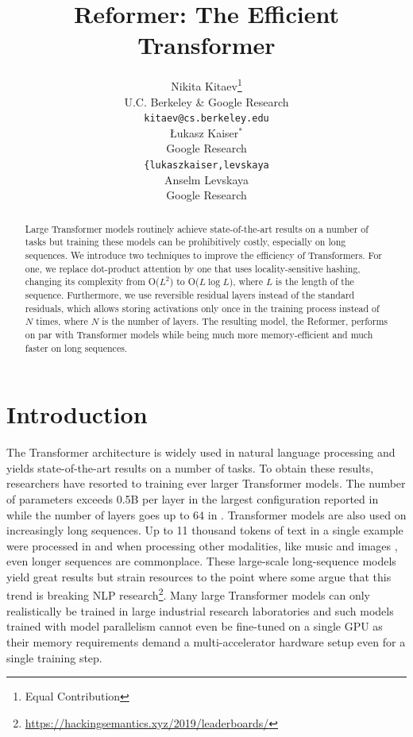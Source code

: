 \documentclass{article} %
\title{Reformer: The Efficient Transformer}
\author{Nikita Kitaev\thanks{Equal Contribution}  \\
U.C. Berkeley \& Google Research\\
\texttt{kitaev@cs.berkeley.edu} \\
\And 
\L{}ukasz Kaiser$^*$ \\
Google Research\\
\texttt{\{lukaszkaiser,levskaya\rlap{\}@google.com}} \\
\And 
Anselm Levskaya \\
Google Research\\
}
\begin{document}
\maketitle

\begin{abstract}
Large Transformer models routinely achieve state-of-the-art results on
a number of tasks but training these models can be prohibitively costly,
especially on long sequences. We introduce two techniques to improve
the efficiency of Transformers. For one, we replace dot-product attention
by one that uses locality-sensitive hashing, changing its complexity
from O($L^2$) to O($L\log L$), where $L$ is the length of the sequence.
Furthermore, we use reversible residual layers instead of the standard
residuals, which allows storing activations only once in the training
process instead of $N$ times, where $N$ is the number of layers.
The resulting model, the Reformer, performs on par with Transformer models
while being much more memory-efficient and much faster on long sequences.
\end{abstract}

\section{Introduction}

The Transformer architecture \citep{transformer} is widely used in natural language processing
and yields state-of-the-art results on a number of tasks. To obtain these results,
researchers have resorted to training ever larger Transformer models. The number of parameters exceeds
0.5B per layer in the largest configuration reported in \citep{meshtf} while the number
of layers goes up to 64 in \citep{chartransformer}. Transformer models are also used on
increasingly long sequences. Up to 11 thousand tokens of text in a single example were
processed in \citep{wikipedia} and when processing other modalities, like music \citep{huang2018music}
and images \citep{parmar2018imagetransformer}, even longer sequences are commonplace.
These large-scale long-sequence models yield great results but strain resources to
the point where some argue that this trend is breaking NLP
research\footnote{\url{https://hackingsemantics.xyz/2019/leaderboards/}}.
Many large Transformer models can only realistically be trained in large
industrial research laboratories and such models trained with model parallelism
cannot even be fine-tuned on a single GPU as their memory requirements demand a 
multi-accelerator hardware setup even for a single training step.
\end{document}
